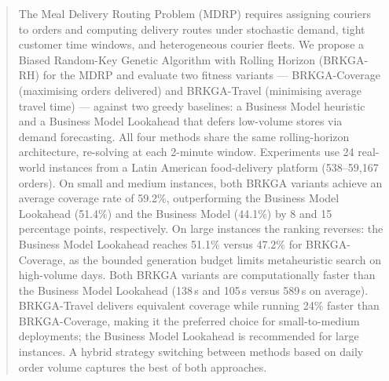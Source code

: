 
\begin{abstract}
The Meal Delivery Routing Problem (MDRP) requires assigning couriers
to orders and computing delivery routes under stochastic demand,
tight customer time windows, and heterogeneous courier fleets.
We propose a Biased Random-Key Genetic Algorithm with Rolling Horizon
(BRKGA-RH) for the MDRP and evaluate two fitness variants ---
BRKGA-Coverage (maximising orders delivered) and BRKGA-Travel
(minimising average travel time) --- against two greedy baselines:
a Business Model heuristic and a Business Model Lookahead that
defers low-volume stores via demand forecasting.
All four methods share the same rolling-horizon architecture,
re-solving at each 2-minute window.
Experiments use 24 real-world instances from a Latin American
food-delivery platform (538--59{,}167 orders).
On small and medium instances, both BRKGA variants achieve an average
coverage rate of 59.2\%, outperforming the Business Model Lookahead
(51.4\%) and the Business Model (44.1\%) by 8 and 15 percentage
points, respectively.
On large instances the ranking reverses: the Business Model Lookahead
reaches 51.1\% versus 47.2\% for BRKGA-Coverage, as the bounded
generation budget limits metaheuristic search on high-volume days.
Both BRKGA variants are computationally faster than the Business
Model Lookahead (138\,s and 105\,s versus 589\,s on average).
BRKGA-Travel delivers equivalent coverage while running 24\% faster
than BRKGA-Coverage, making it the preferred choice for
small-to-medium deployments; the Business Model Lookahead is
recommended for large instances.
A hybrid strategy switching between methods based on daily order
volume captures the best of both approaches.

\end{abstract}
